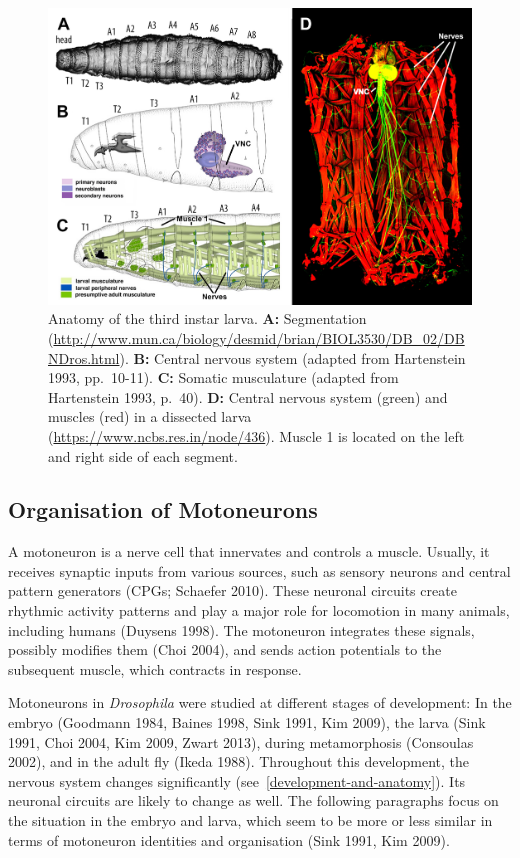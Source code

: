 \documentclass[12pt,a4paper,]{report}
\begin{document}
\begin{figure}
\centering
\includegraphics[]{images/larva-anatomy.png}
\caption[Anatomy of the third instar larva]{Anatomy of the third instar larva. \textbf{A:}
Segmentation
(\url{http://www.mun.ca/biology/desmid/brian/BIOL3530/DB_02/DBNDros.html}).
\textbf{B:} Central nervous system (adapted from Hartenstein 1993,
pp.~10-11). \textbf{C:} Somatic musculature (adapted from Hartenstein
1993, p.~40). \textbf{D:} Central nervous system (green) and muscles
(red) in a dissected larva (\url{https://www.ncbs.res.in/node/436}).
Muscle 1 is located on the left and right side of each
segment.}\label{larva-anatomy}
\end{figure}

\subsection{Organisation of
Motoneurons}\label{organisation-of-motoneurons}

A motoneuron is a nerve cell that innervates and controls a muscle.
Usually, it receives synaptic inputs from various sources, such as
sensory neurons and central pattern generators (CPGs; Schaefer 2010).
These neuronal circuits create rhythmic activity patterns and play a
major role for locomotion in many animals, including humans (Duysens
1998). The motoneuron integrates these signals, possibly modifies them
(Choi 2004), and sends action potentials to the subsequent muscle, which
contracts in response.

Motoneurons in \emph{Drosophila} were studied at different stages of
development: In the embryo (Goodmann 1984, Baines 1998, Sink 1991, Kim
2009), the larva (Sink 1991, Choi 2004, Kim 2009, Zwart 2013), during
metamorphosis (Consoulas 2002), and in the adult fly (Ikeda 1988).
Throughout this development, the nervous system changes significantly
(see~\ref{development-and-anatomy}). Its neuronal circuits are likely to
change as well. The following paragraphs focus on the situation in the
embryo and larva, which seem to be more or less similar in terms of
motoneuron identities and organisation (Sink 1991, Kim 2009).
\end{document}
